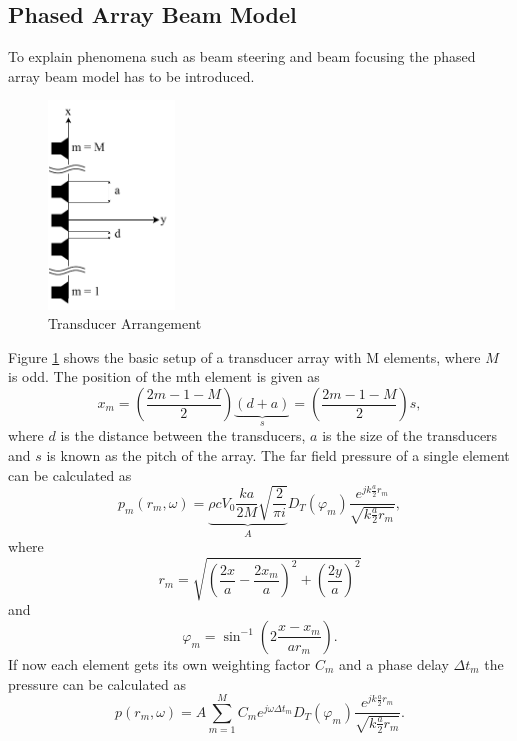 \subsection{Phased Array Beam Model}\label{3_subsec:phased_array_model}
To explain phenomena such as beam steering and beam focusing the phased array beam model has to be introduced.
 \begin{figure}[h!]
     \centering
     \includegraphics[width=0.3\textwidth]{images/3_Parametric_array/Transducer_Arangement.pdf}
     \caption{Transducer Arrangement}
     \label{3_Parametric_array_img:Transducer_Model}
 \end{figure}
Figure \ref{3_Parametric_array_img:Transducer_Model} shows the basic setup of a transducer array with M elements, where $M$ is odd. The position of the mth element is given as \cite{alma99116706330905515} 
\begin{equation}\label{3.4_eq:simplified_xm}
    x_m 
    = 
    \left ( \frac{2m -1 - M}{2} \right ) \underbrace{(d + a)}_{s}
    =
    \left ( \frac{2m -1 - M}{2} \right ) s,
\end{equation}
where $d$ is the distance between the transducers, $a$ is the size of the transducers and $s$ is known as the pitch of the array. 
The far field pressure of a single element can be calculated as \cite{alma99116706330905515}
\begin{equation}
    p_m(r_m,\omega) 
    =
    \underbrace{\rho c V_0 \frac{k a}{2 M} \sqrt{\frac{2}{\pi i}}}_{A} D_T(\varphi_{m}) \frac{e^{j k \frac{a}{2} r_m}}{\sqrt{k \frac{a}{2} r_m}}, 
\end{equation}
where
\begin{equation}
    r_m
    = 
    \sqrt{\left ( \frac{2x}{a} - \frac{2x_m}{a}\right )^2 + \left ( \frac{2y}{a} \right )^2}
\end{equation}
and 
\begin{equation}
    \varphi_m = \sin^{-1}{\left ( 2\frac{x - x_m}{a r_m} \right )}.
\end{equation}
If now each element gets its own weighting factor $C_m$ and a phase delay $\Delta t_m$ the pressure can be calculated as 
\begin{equation}
    p(r_m,\omega) 
    = 
    A \sum_{m=1}^M C_m e^{j\omega \Delta t_m}  D_T(\varphi_{m}) \frac{e^{j k \frac{a}{2} r_m}}{\sqrt{k \frac{a}{2} r_m}}.
\end{equation}
